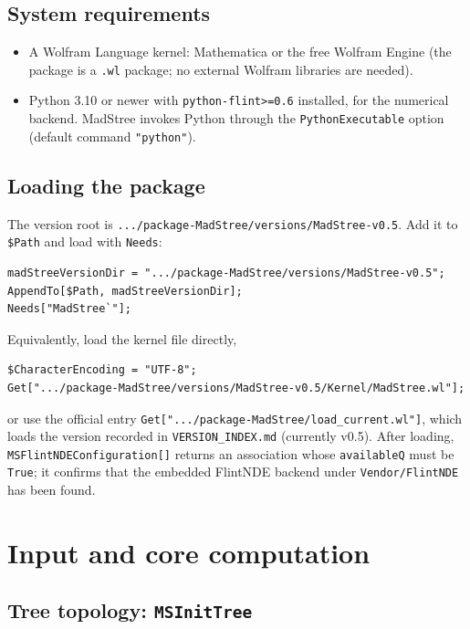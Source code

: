\documentclass[11pt,a4paper]{article}
\begin{document}
\subsection{System requirements}
\begin{itemize}
  \item A Wolfram Language kernel: Mathematica or the free Wolfram Engine (the package is a
        \texttt{.wl} package; no external Wolfram libraries are needed).
  \item Python 3.10 or newer with \texttt{python-flint>=0.6} installed, for the numerical backend.
        MadStree invokes Python through the \texttt{PythonExecutable} option (default command
        \texttt{"python"}).
\end{itemize}

\subsection{Loading the package}

The version root is \texttt{.../package-MadStree/versions/MadStree-v0.5}. Add it to
\texttt{\$Path} and load with \texttt{Needs}:
\begin{verbatim}
madStreeVersionDir = ".../package-MadStree/versions/MadStree-v0.5";
AppendTo[$Path, madStreeVersionDir];
Needs["MadStree`"];
\end{verbatim}
Equivalently, load the kernel file directly,
\begin{verbatim}
$CharacterEncoding = "UTF-8";
Get[".../package-MadStree/versions/MadStree-v0.5/Kernel/MadStree.wl"];
\end{verbatim}
or use the official entry \texttt{Get[".../package-MadStree/load\_current.wl"]}, which loads the
version recorded in \texttt{VERSION\_INDEX.md} (currently v0.5). After loading,
\texttt{MSFlintNDEConfiguration[]} returns an association whose \texttt{availableQ} must be
\texttt{True}; it confirms that the embedded FlintNDE backend under \texttt{Vendor/FlintNDE} has
been found.

\section{Input and core computation}
\label{sec:inputs}

\subsection{Tree topology: \texttt{MSInitTree}}
\end{document}
